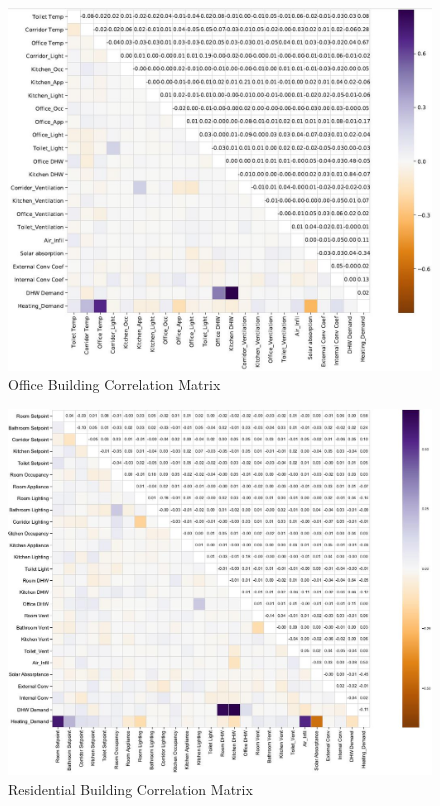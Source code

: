 \documentclass[a4paper, oneside]{discothesis}
\begin{document}
		
	    \begin{figure}[H]
		\centering
		\includegraphics[scale=0.6]{Sumatra_Matrix.jpg}
		\caption{Office Building Correlation Matrix}
		\label{fig:Sumatra_Matrix}
		\end{figure}
			
	    \begin{figure}[H]
		\centering
		\includegraphics[scale=0.6]{Hongger_Matrix.jpg}
		\caption{Residential Building Correlation Matrix}
		\label{fig:Hongg_Matrix}
		\end{figure}
\end{document}
